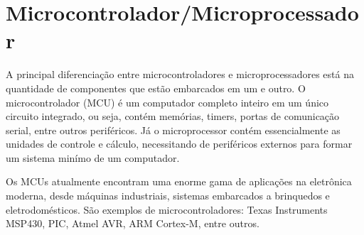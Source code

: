 \noindent
\begin{minipage}{\linewidth}
\label{pc104_dimensions_fig}
\end{minipage}

\section{Microcontrolador/Microprocessador}\label{mcu_revision}

A principal diferenciação entre microcontroladores e microprocessadores está na quantidade de componentes que estão embarcados em um e outro. O microcontrolador (MCU) é um computador completo inteiro em um único circuito integrado, ou seja, contém memórias, timers, portas de comunicação serial, entre outros periféricos. Já o microprocessor contém essencialmente as unidades de controle e cálculo, necessitando de periféricos externos para formar um sistema minímo de um computador.

Os MCUs atualmente encontram uma enorme gama de aplicações na eletrônica moderna, desde máquinas industriais, sistemas embarcados a brinquedos e eletrodomésticos. São exemplos de microcontroladores: Texas Instruments MSP430, PIC, Atmel AVR, ARM Cortex-M, entre outros.

